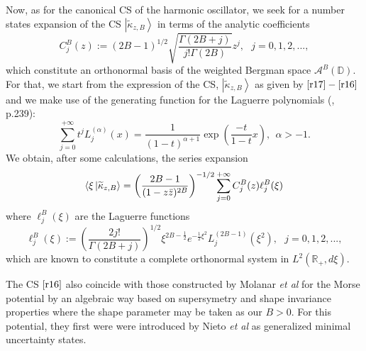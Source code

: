 Now, as for the canonical CS of the harmonic oscillator, we seek for a
number states expansion of the CS $\left\vert \widetilde{\kappa }%
_{z,B}\right\rangle $ in terms of the analytic coefficients 
\begin{equation}
\label{r20}
C_{j}^{B}(z):=(2B-1)^{1/2}\sqrt{\frac{\Gamma (2B+j)}{j!\Gamma (2B)}}z^{j},%
\text{ \ \ }j=0,1,2,...,  
\end{equation}
which constitute an orthonormal basis of the weighted Bergman space $%
\mathcal{A}^{B}(\mathbb{D})$. For that, we start from the expression of the
CS, $\left\vert \widetilde{\kappa }_{z,B}\right\rangle $ as given by $\eqref{r17}-\eqref{r16}$  and we make use of the generating function
for the Laguerre polynomials (\cite{MaOb}, p.239): 
\begin{equation}
\label{r21}
\sum_{j=0}^{+\infty }t^{j}L_{j}^{(\alpha )}(x)=\frac{1}{(1-t)^{\alpha +1}}%
\exp \left( \frac{-t}{1-t}x\right) ,\ \ \alpha >-1.  
\end{equation}
We obtain, after some calculations, the series expansion 
\begin{equation}
\label{r22}
\langle \xi \left\vert \widetilde{\kappa }_{z,B}\right\rangle =\left( \frac{%
2B-1}{(1-z\bar{z})^{2B}}\right) ^{-1/2}\sum_{j=0}^{+\infty }C_{j}^{B}(z)\ell
_{j}^{B}(\xi )  
\end{equation}
where $\ell _{j}^{B}(\xi )$ are the Laguerre functions 
\begin{equation}
\label{r23}
\ell _{j}^{B}(\xi ):=\left( \frac{2j!}{\Gamma (2B+j)}\right) ^{1/2}\xi ^{2B-%
\frac{1}{2}}e^{-\frac{1}{2}\xi ^{2}}L_{j}^{(2B-1)}(\xi ^{2}),\text{ \ \ }%
j=0,1,2,..., 
\end{equation}
which are known to constitute a complete orthonormal system in $L^{2}(%
\mathbb{R}_{+},d\xi )$.

\smallskip

 \begin{remark}
 The CS $\eqref{r16} $ also coincide with those
constructed by Molanar \textit{et al} \cite{BMMB} for the Morse
potential \cite{MP} by an algebraic way based on supersymetry and
shape invariance properties where the shape parameter may be taken as our $%
B>0$. For this potential, they first were were introduced by Nieto \textit{%
et al} \cite{NMSL} as generalized minimal uncertainty
states.
\end{remark}


































